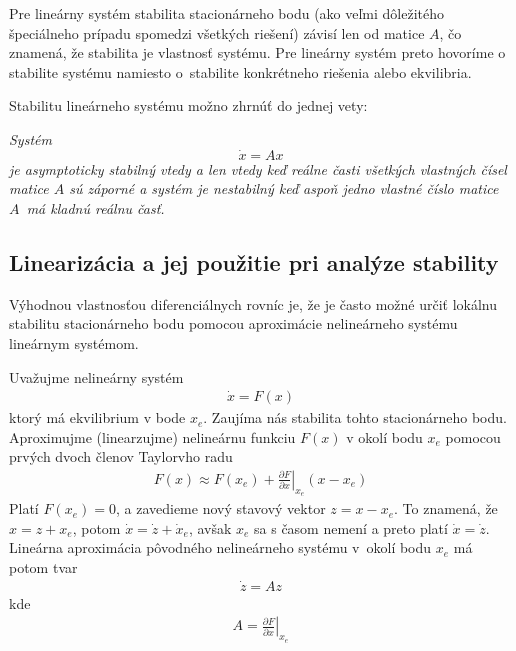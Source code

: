 \documentclass[a4paper, 10pt, ]{article}
\begin{document}
Pre lineárny systém stabilita stacionárneho bodu (ako veľmi dôležitého špeciálneho prípadu spomedzi všetkých riešení) závisí len od matice $A$, čo znamená, že stabilita je vlastnosť systému. Pre lineárny systém preto hovoríme o stabilite systému namiesto o~stabilite konkrétneho riešenia alebo ekvilibria.


Stabilitu lineárneho systému možno zhrnúť do jednej vety:

{ \it
\noindent
Systém
\begin{equation*}
	\dot{x} = A x
\end{equation*}
je asymptoticky stabilný vtedy a len vtedy keď reálne časti všetkých vlastných čísel matice $A$ sú záporné a systém je nestabilný keď aspoň jedno vlastné číslo matice $A$~má kladnú reálnu časť.
}









\subsection{Linearizácia a jej použitie pri analýze stability}




Výhodnou vlastnosťou diferenciálnych rovníc je, že je často možné určiť lokálnu stabilitu stacionárneho bodu pomocou aproximácie nelineárneho systému lineárnym systémom.

Uvažujme nelineárny systém
\begin{align}
	\dot{x} = F(x)
\end{align}
ktorý má ekvilibrium v bode $x_e$. Zaujíma nás stabilita tohto stacionárneho bodu. Aproximujme (linearzujme) nelineárnu funkciu $F(x)$ v okolí bodu $x_e$ pomocou prvých dvoch členov Taylorvho radu
\begin{align}
	F(x) \approx F(x_e) + \left. \frac{\partial F}{\partial x} \right|_{x_e} (x - x_e)
\end{align}
Platí $F(x_e) = 0$, a zavedieme nový stavový vektor $z = x - x_e$. To znamená, že $x = z + x_e$, potom $\dot{x} = \dot{z} + \dot{x}_e$, avšak $x_e$ sa s časom nemení a preto platí  $\dot{x} = \dot{z}$. Lineárna aproximácia pôvodného nelineárneho systému v~okolí bodu $x_e$ má potom tvar
\begin{align}
	\dot{z} = Az
\end{align}
kde
\begin{align} \label{matApoLinearizacii}
	A = \left. \frac{\partial F}{\partial x} \right|_{x_e}
\end{align}
\end{document}
